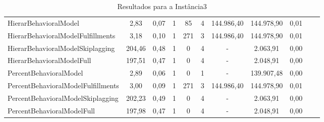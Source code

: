 \begin{table}[h!]
{\begin{tabular}{lcccccccccc}
			HierarBehavioralModel                                                       & 2,83   & 0,07 & 1 & 85  & 4 & 144.986,40 & 144.978,90 & 0,01 \\
			HierarBehavioralModelFulfillments                                           & 3,18   & 0,10 & 1 & 271 & 3 & 144.986,40 & 144.978,90 & 0,01 \\
			HierarBehavioralModelSkiplagging                                            & 204,46 & 0,48 & 1 & 0   & 4 & -          & 2.063,91   & 0,00 \\
			HierarBehavioralModelFull                                                   & 197,51 & 0,47 & 1 & 0   & 4 & -          & 2.048,91   & 0,00 \\ \hline
			PercentBehavioralModel                                                      & 2,89   & 0,06 & 1 & 0   & 1 & -          & 139.907,48 & 0,00 \\
			PercentBehavioralModelFulfillments                                          & 3,00   & 0,09 & 1 & 271 & 3 & 144.986,40 & 144.978,90 & 0,01 \\
			PercentBehavioralModelSkiplagging                                           & 202,23 & 0,49 & 1 & 0   & 4 & -          & 2.063,91   & 0,00 \\
			PercentBehavioralModelFull                                                  & 197,98 & 0,47 & 1 & 0   & 4 & -          & 2.048,91   & 0,00 \\ \hline
		\end{tabular}%
	}
	\caption{Resultados para a Instância3}
	\label{tab:resul_instan3}
\end{table}


